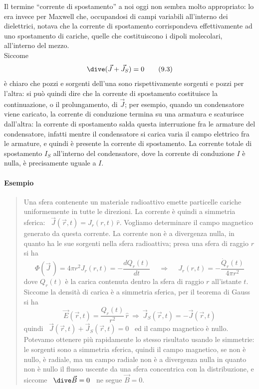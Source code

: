 Il termine ``corrente di spostamento'' a noi oggi non sembra molto appropriato:
lo era invece per Maxwell che, occupandosi di campi variabili all'interno dei
dielettrici, notava che la corrente di spostamento corrispondeva effettivamente
ad uno spostamento di cariche, quelle che costituiscono i dipoli molecolari,
all'interno del mezzo.\\
Siccome
\begin{equation}
  \dive(\vec J+\vec J_S)=0
  \tag{9.3}
\end{equation}
\`e chiaro che pozzi e sorgenti dell'una sono rispettivamente sorgenti e pozzi
per l'altra: si pu\`o quindi dire che la corrente di spostamento costituisce la
continuazione, o il prolungamento, di $\vec J$; per esempio, quando un
condensatore viene caricato, la corrente di conduzione termina su una armatura e
scaturisce dall'altra: la corrente di spostamento salda questa interruzione fra
le armature del condensatore, infatti mentre il condensatore si carica varia il
campo elettrico fra le armature, e quindi \`e presente la corrente di
spostamento. La corrente totale di spostamento $I_S$ all'interno del
condensatore, dove la corrente di conduzione $I$ \`e nulla, \`e precisamente
uguale a $I$.

\paragraph{Esempio}
\begin{quote}
  Una sfera contenente un materiale radioattivo emette particelle cariche
  uniformemente in tutte le direzioni. La corrente \`e quindi a simmetria
  sferica: \ $\vec J(\vec r,t)=J_r(r,t)\,\hat r$. Vogliamo determinare il campo
  magnetico generato da questa corrente.
  La corrente non \`e a divergenza nulla, in quanto ha le sue sorgenti nella
  sfera radioattiva; presa una sfera di raggio $r$ si ha
  \begin{equation}
    \Phi(\vec J\,)=4\pi r^2J_r(r,t)=-\frac{dQ_r(t)}{dt}
    \quad\ \Rightarrow\quad\ J_r(r,t)=-\frac{\dot Q_r(t)}{4\pi r^2}
    \tag{9.4}
  \end{equation}
  dove $Q_r(t)$ \`e la carica contenuta dentro la sfera di raggio $r$
  all'istante $t$. Siccome la densit\`a di carica \`e a simmetria sferica, per
  il teorema di Gauss si ha
  \begin{equation}
    \vec E(\vec r,t)=\frac{Q_r(t)}{r^2}\,\hat r
    \ \Rightarrow\ \vec J_S(\vec r,t)=-\vec J(\vec r,t)
    \tag{9.5}
  \end{equation}
  quindi \ $\vec J(\vec r,t)+\vec J_S(\vec r,t)=0$ \ ed il campo magnetico \`e
  nullo.\\
  Potevamo ottenere pi\`u rapidamente lo stesso risultato usando le simmetrie:
  le sorgenti sono a simmetria sferica, quindi il campo magnetico, se non \`e
  nullo, \`e radiale, ma un campo radiale non \`e a divergenza nulla in quanto
  non \`e nullo il flusso uscente da una sfera concentrica con la distribuzione,
  e siccome \ $\dive\vec B=0$ \ ne segue $\vec B=0$.
\end{quote}

